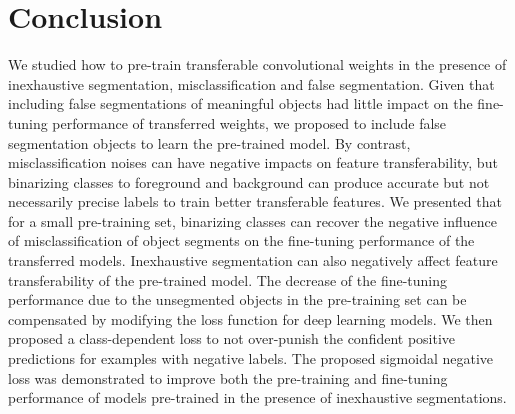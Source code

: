\section{Conclusion}
\label{sec:conclusion}

We studied how to pre-train transferable convolutional weights in the presence of inexhaustive segmentation, misclassification and false segmentation.
Given that including false segmentations of meaningful objects had little impact on the fine-tuning performance of transferred weights, we proposed to include false segmentation objects to learn the pre-trained model.
By contrast, misclassification noises can have negative impacts on feature transferability, but binarizing classes to foreground and background can produce accurate but not necessarily precise labels to train better transferable features.
We presented that for a small pre-training set, binarizing classes can recover the negative influence of misclassification of object segments on the fine-tuning performance of the transferred models.
Inexhaustive segmentation can also negatively affect feature transferability of the pre-trained model.
The decrease of the fine-tuning performance due to the unsegmented objects in the pre-training set can be compensated by modifying the loss function for deep learning models.
We then proposed a class-dependent loss to not over-punish the confident positive predictions for examples with negative labels.
The proposed sigmoidal negative loss was demonstrated to improve both the pre-training and fine-tuning performance of models pre-trained in the presence of inexhaustive segmentations.
